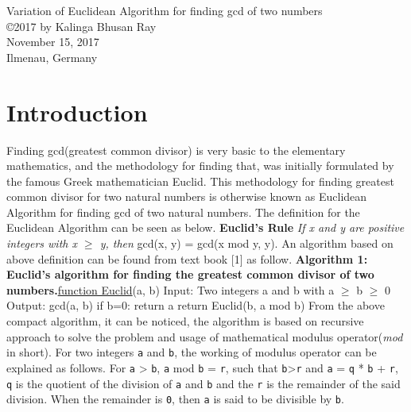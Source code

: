 \documentclass[12pt]{article}
\begin{document}
\begin{center}
{\large Variation of Euclidean Algorithm for finding gcd of two numbers} \\
\copyright 2017 by Kalinga Bhusan Ray \\
November 15, 2017 \\
Ilmenau, Germany \\
\author{Kalinga Bhusan Ray}
\end{center}

\section{Introduction}
Finding gcd(greatest common divisor) is very basic to the elementary mathematics, 
and the methodology for finding that, was initially formulated by the famous Greek mathematician Euclid. This methodology for finding greatest common divisor for two natural numbers is otherwise known as Euclidean Algorithm for finding gcd of two 
natural numbers. The definition for the Euclidean Algorithm can be seen as below.
\newline \newline \textbf {Euclid's Rule} \textit {If x and y are positive integers with x $\geq$ y,
 then} \break \vspace{0mm} \hspace{4cm} gcd(x, y) = gcd(x mod y, y).
\newline 
\newline An algorithm based on above definition can be found from text book [1] as follow.
\newline \textbf{Algorithm 1:}
\newline \textbf {Euclid's algorithm for finding the greatest common divisor of two numbers.}\newline \underline {function Euclid}(a, b)
\newline Input: Two integers a and b with a $\geq$ b $\geq$ 0 
\newline Output: gcd(a, b)
\newline
\newline if b=0: return a
\newline return Euclid(b, a mod b)
\newline 
\newline From the above compact algorithm, it can be noticed, the algorithm is based on recursive approach to solve the problem and usage of mathematical modulus operator(\textit {mod} in short).
For two integers \texttt{a} and \texttt{b}, the working of modulus operator can be explained as follows.
For \texttt{a} > \texttt{b}, \texttt{a} mod \texttt{b} = \texttt{r},  such that \texttt{b}>\texttt{r} and  \texttt{a} = \texttt{q} * \texttt{b} + \texttt{r}, \texttt{q} is the quotient of the division of \texttt{a} and \texttt{b} and the \texttt{r} is the remainder of the said division. When the remainder is \texttt{0}, then \texttt{a} is said to be divisible by \texttt{b}.
\end{document}
